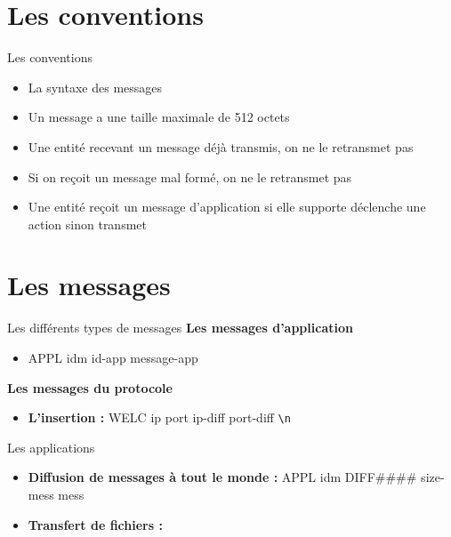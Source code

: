 \documentclass{beamer}
\newcommand*{\escape}[1]{\texttt{\textbackslash#1}}
\begin{document}
\section{Les conventions }
\begin{frame}{Les conventions}
	 \begin{itemize}
		 \item<1-5> La syntaxe des messages
		 \item<2-5> Un message a une taille maximale de 512 octets
 		 \item<3-5> Une entité recevant un message déjà transmis, on ne le retransmet pas
 		 \item<4-5> Si on reçoit un message mal formé, on ne le retransmet pas
 		 \item<5-5> Une entité reçoit un message d'application si elle supporte déclenche une action sinon transmet
	\end{itemize}
\end{frame}

\section{Les messages}
\begin{frame}{Les différents types de messages}
	\textbf{Les messages d'application}
	\begin{itemize}
		 \item<1-9> APPL idm id-app message-app
	\end{itemize}
	\textbf{Les messages du protocole}
	\begin{itemize}
		 \item<2-9> \textbf{L'insertion : } WELC ip port ip-diff port-diff \escape{n}
	\end{itemize}
\end{frame}


\begin{frame}{Les applications}
	\begin{itemize}
		 \item<1-2> \textbf{Diffusion de messages à tout le monde :} APPL idm DIFF\#\#\#\# size-mess mess
 		 \item<2-2> \textbf{Transfert de fichiers :} 
	\end{itemize}
\end{frame}
\end{document}

